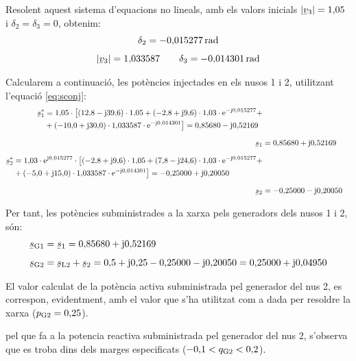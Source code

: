 \begin{exemple}
Resolent aquest sistema d'equacions no lineals, amb els valors
inicials $|\cmplx{v}_3|=1{,}05$ i $\delta_2=\delta_3=0$, obtenim:
\begin{gather*}
   \delta_2=-0{,}015277\unit{rad} \\[1ex]
   |\cmplx{v}_3|=1{,}033587 \qquad \delta_3=-0{,}014301\unit{rad}
\end{gather*}

Calcularem a continuaci\'{o}, les pot\`{e}ncies injectades en els nusos 1 i
2, utilitzant l'equaci\'{o} \eqref{eq:sconj}:
\begin{align*}
\begin{split}
\cmplx{s}_1^* &= 1{,}05 \cdot\bigl[ (12{,}8-\ju39{,}6) \cdot 1{,}05
+
(-2{,}8+\ju9{,}6) \cdot 1{,}03\cdot\eu^{-\ju0{,}015277} + \\
&+ (-10{,}0+\ju30{,}0) \cdot 1{,}033587\cdot\eu^{-\ju0{,}014301}
\bigr] = 0{,}85680 - \ju 0{,}52169
\end{split} \\[1.5ex]
\cmplx{s}_1 &= 0{,}85680 + \ju 0{,}52169 \\[1.5ex]
\begin{split}
\cmplx{s}_2^* &= 1{,}03 \cdot\eu^{\ju0{,}015277} \cdot\bigl[
(-2{,}8+\ju9{,}6) \cdot 1{,}05 +
 (7{,}8-\ju24{,}6) \cdot 1{,}03\cdot\eu^{-\ju0{,}015277} + \\
& + (-5{,}0+\ju15{,}0) \cdot 1{,}033587\cdot\eu^{-\ju0{,}014301}
\bigr] = -0{,}25000 + \ju 0{,}20050
\end{split} \\[1.5ex]
 \cmplx{s}_2 &= -0{,}25000 - \ju 0{,}20050
\end{align*}

Per tant, les pot\`{e}ncies subministrades a la xarxa pels generadors
dels nusos 1 i 2, s\'{o}n:
\begin{align*}
\cmplx{s}\ped{G1} &= \cmplx{s}_1 = 0{,}85680 + \ju 0{,}52169 \\[1ex]
\cmplx{s}\ped{G2} &= \cmplx{s}\ped{L2} + \cmplx{s}_2 = 0{,}5 + \ju
0{,}25 -0{,}25000 - \ju 0{,}20050  = 0{,}25000 + \ju 0{,}04950
\end{align*}

El valor calculat de la pot\`{e}ncia activa subministrada pel generador
del nus 2, es
 correspon, evidentment, amb el valor que s'ha utilitzat com a dada per
resoldre la xarxa ($p_\mathrm{G2}=0{,}25$).

pel que fa a la potencia reactiva subministrada pel generador del
nus 2, s'observa que es troba dins dels  marges especificats
($-0{,}1<q_\mathrm{G2}<0{,}2$).
\end{exemple}

